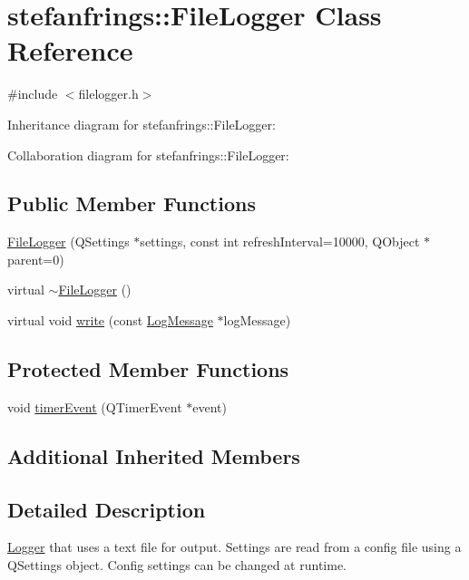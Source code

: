 \hypertarget{classstefanfrings_1_1_file_logger}{}\section{stefanfrings\+:\+:File\+Logger Class Reference}
\label{classstefanfrings_1_1_file_logger}


{\ttfamily \#include $<$filelogger.\+h$>$}



Inheritance diagram for stefanfrings\+:\+:File\+Logger\+:


Collaboration diagram for stefanfrings\+:\+:File\+Logger\+:
\subsection*{Public Member Functions}
\begin{DoxyCompactItemize}
\item 
\mbox{\hyperlink{classstefanfrings_1_1_file_logger_a7cc3a8036804d29ce4df0d431289e5b8}{File\+Logger}} (Q\+Settings $\ast$settings, const int refresh\+Interval=10000, Q\+Object $\ast$parent=0)
\item 
virtual \mbox{\hyperlink{classstefanfrings_1_1_file_logger_ab08af44f2de3fe1b51158132f9a399dd}{$\sim$\+File\+Logger}} ()
\item 
virtual void \mbox{\hyperlink{classstefanfrings_1_1_file_logger_a9258a5e72c22a6b14e25af8eae2092c1}{write}} (const \mbox{\hyperlink{classstefanfrings_1_1_log_message}{Log\+Message}} $\ast$log\+Message)
\end{DoxyCompactItemize}
\subsection*{Protected Member Functions}
\begin{DoxyCompactItemize}
\item 
void \mbox{\hyperlink{classstefanfrings_1_1_file_logger_a01eac5311649ce150df7bdf084925d05}{timer\+Event}} (Q\+Timer\+Event $\ast$event)
\end{DoxyCompactItemize}
\subsection*{Additional Inherited Members}


\subsection{Detailed Description}
\mbox{\hyperlink{classstefanfrings_1_1_logger}{Logger}} that uses a text file for output. Settings are read from a config file using a Q\+Settings object. Config settings can be changed at runtime. 

